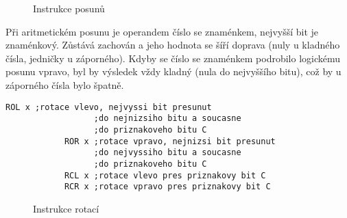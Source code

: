           \begin{figure}[ht!]
            \centering
            \hspace{1em}
            \newline
            \caption{Instrukce posunů}
          \end{figure}
         
          Při aritmetickém posunu je operandem číslo se znaménkem, nejvyšší bit je znaménkový. 
          Zůstává zachován a jeho hodnota se šíří doprava (nuly u kladného čísla, jedničky u 
          záporného). Kdyby se číslo se znaménkem podrobilo logickému posunu vpravo, byl by 
          výsledek vždy kladný (nula do nejvyššího bitu), což by u záporného čísla bylo špatně.

          \begin{lstlisting}[style=luaMITASMStyle]
            ROL x ;rotace vlevo, nejvyssi bit presunut 
                  ;do nejnizsiho bitu a soucasne
                  ;do priznakoveho bitu C
            ROR x ;rotace vpravo, nejnizsi bit presunut 
                  ;do nejvyssiho bitu a soucasne
                  ;do priznakoveho bitu C
            RCL x ;rotace vlevo pres priznakovy bit C
            RCR x ;rotace vpravo pres priznakovy bit C
          \end{lstlisting}
          
          \begin{figure}[ht!]
            \centering
            \hspace{1em}
            \newline
            \hspace{1em}
            \caption{Instrukce rotací}
          \end{figure}
          
